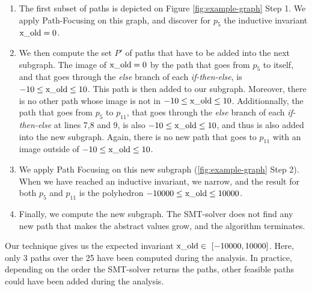 \documentclass[preprint]{sigplanconf}
\begin{document}
\begin{enumerate}
	\item The first subset of paths is depicted on Figure
		\ref{fig:example-graph} Step 1. We apply Path-Focusing on this graph,
		and discover for $p_5$ the inductive invariant $\lstinline|x_old| = 0$.
	\item
		We then compute the set $P'$ of paths that have to be added into the
		next subgraph. 
		The image of $\lstinline|x_old| = 0$ by the path that goes from $p_5$ to
		itself, and that goes through the \emph{else} branch of each 
		\emph{if-then-else}, is $-10 \leq \lstinline|x_old| \leq 10$. This path
		is then added to our subgraph. Moreover, there is no other path whose
		image is not in $-10 \leq \lstinline|x_old| \leq 10$.
		Additionnally, the path that goes from $p_5$ to
		$p_11$, that goes through the \emph{else} branch of each 
		\emph{if-then-else} at lines 7,8 and 9, is also 
		$-10 \leq \lstinline|x_old| \leq 10$, and thus is also added into the
		new subgraph. Again, there is no new path that goes to $p_11$ with an
		image outside of $-10 \leq \lstinline|x_old| \leq 10$.
	\item
		We apply Path Focusing on this new subgraph (\ref{fig:example-graph}
		Step 2). When we have reached an inductive invariant, we narrow, and the
		result for both $p_5$ and $p_11$ is the polyhedron 
		$-10000 \leq \lstinline|x_old| \leq 10000$.
	\item Finally, we compute the new subgraph. The SMT-solver does not find any
		new path that makes the abstract values grow, and the algorithm
		terminates.
\end{enumerate}

Our technique gives us the expected invariant 
$\lstinline|x_old| \in~[-10000,10000]$. 
Here, only 3 paths over the 25 have been computed during the analysis. In
practice, depending on the order the SMT-solver returns the paths, other
feasible paths could have been added during the analysis.
\end{document}
